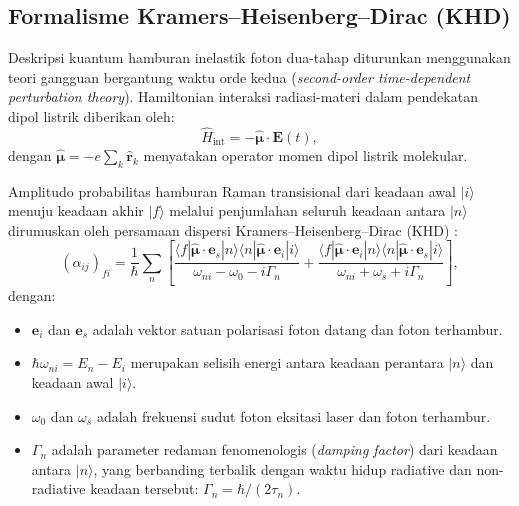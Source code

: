 \subsection{Formalisme Kramers--Heisenberg--Dirac (KHD)}
Deskripsi kuantum hamburan inelastik foton dua-tahap diturunkan menggunakan teori gangguan bergantung waktu orde kedua (\textit{second-order time-dependent perturbation theory}). Hamiltonian interaksi radiasi-materi dalam pendekatan dipol listrik diberikan oleh:
\begin{equation}
\hat{H}_{\mathrm{int}} = - \hat{\boldsymbol{\mu}} \cdot \mathbf{E}(t),
\label{eq:hamiltonian_interaksi}
\end{equation}
dengan $\hat{\boldsymbol{\mu}} = -e \sum_k \hat{\mathbf{r}}_k$ menyatakan operator momen dipol listrik molekular.

Amplitudo probabilitas hamburan Raman transisional dari keadaan awal $|i\rangle$ menuju keadaan akhir $|f\rangle$ melalui penjumlahan seluruh keadaan antara $|n\rangle$ dirumuskan oleh persamaan dispersi Kramers--Heisenberg--Dirac (KHD) \cite{kramers1925streuung,dirac1927quantum,albrecht1961theory}:
\begin{equation}
(\alpha_{ij})_{fi} = \frac{1}{\hbar} \sum_{n} \left[ 
\frac{\langle f | \hat{\boldsymbol{\mu}} \cdot \mathbf{e}_s | n \rangle \langle n | \hat{\boldsymbol{\mu}} \cdot \mathbf{e}_i | i \rangle}{\omega_{ni} - \omega_0 - i\Gamma_n} + 
\frac{\langle f | \hat{\boldsymbol{\mu}} \cdot \mathbf{e}_i | n \rangle \langle n | \hat{\boldsymbol{\mu}} \cdot \mathbf{e}_s | i \rangle}{\omega_{ni} + \omega_s + i\Gamma_n}
\right],
\label{eq:khd_amplitudo}
\end{equation}
dengan:
\begin{itemize}
    \item $\mathbf{e}_i$ dan $\mathbf{e}_s$ adalah vektor satuan polarisasi foton datang dan foton terhambur.
    \item $\hbar\omega_{ni} = E_n - E_i$ merupakan selisih energi antara keadaan perantara $|n\rangle$ dan keadaan awal $|i\rangle$.
    \item $\omega_0$ dan $\omega_s$ adalah frekuensi sudut foton eksitasi laser dan foton terhambur.
    \item $\Gamma_n$ adalah parameter redaman fenomenologis (\textit{damping factor}) dari keadaan antara $|n\rangle$, yang berbanding terbalik dengan waktu hidup radiative dan non-radiative keadaan tersebut: $\Gamma_n = \hbar / (2\tau_n)$.
\end{itemize}

